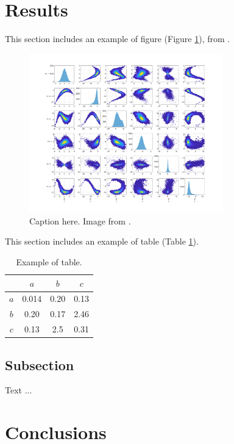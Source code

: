 \documentclass[a4paper,fleqn]{cas-sc}
\begin{document}
\section{Results}


This section includes an example of figure (Figure \ref{fig:Figure1}), from  \cite{de2021direct}.

\begin{figure}
\centering
\includegraphics[width=0.75\textwidth]{figs_rev1/uncond_distribution_reference.png}
\caption{ Caption here. Image from \cite{de2021direct}.}
\label{fig:Figure1}
\end{figure}

This section includes an example of table (Table \ref{tab:Table1}).

\begin{table}
\centering
\caption{Example of table.}
\label{tab:Table1}
\begin{tabular}{ |c||c|c|c|} 
 \hline
     & $a$  &  $b$  &  $c$\\ 
 \hline 
 \hline
$a$ & 0.014 &  0.20    &   0.13  \\
\hline
$b$ & 0.20    &   0.17    &   2.46    \\
\hline
$c$ & 0.13    &   2.5     &   0.31   \\
\hline
\end{tabular} 
\end{table}


\subsection{Subsection}

Text ...

\section{Conclusions}
\end{document}
